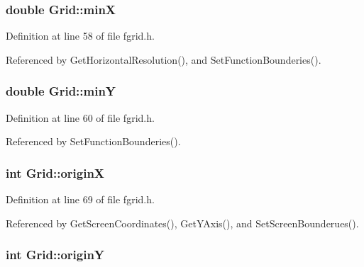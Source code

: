 \subsubsection[{\texorpdfstring{minX}{minX}}]{\setlength{\rightskip}{0pt plus 5cm}double Grid\+::minX\hspace{0.3cm}{\ttfamily [private]}}\hypertarget{classGrid_a70c775fad6a2cfa910a7e1f8c5b3e9b2}{}\label{classGrid_a70c775fad6a2cfa910a7e1f8c5b3e9b2}


Definition at line 58 of file fgrid.\+h.



Referenced by Get\+Horizontal\+Resolution(), and Set\+Function\+Bounderies().

\subsubsection[{\texorpdfstring{minY}{minY}}]{\setlength{\rightskip}{0pt plus 5cm}double Grid\+::minY\hspace{0.3cm}{\ttfamily [private]}}\hypertarget{classGrid_af592907852d983fe13ef9581ffd77e6b}{}\label{classGrid_af592907852d983fe13ef9581ffd77e6b}


Definition at line 60 of file fgrid.\+h.



Referenced by Set\+Function\+Bounderies().

\subsubsection[{\texorpdfstring{originX}{originX}}]{\setlength{\rightskip}{0pt plus 5cm}int Grid\+::originX\hspace{0.3cm}{\ttfamily [private]}}\hypertarget{classGrid_a0c0e10fa32d7fa78985cba0df1a34a0f}{}\label{classGrid_a0c0e10fa32d7fa78985cba0df1a34a0f}


Definition at line 69 of file fgrid.\+h.



Referenced by Get\+Screen\+Coordinates(), Get\+Y\+Axis(), and Set\+Screen\+Bounderues().

\subsubsection[{\texorpdfstring{originY}{originY}}]{\setlength{\rightskip}{0pt plus 5cm}int Grid\+::originY\hspace{0.3cm}{\ttfamily [private]}}\hypertarget{classGrid_add0854295a7e36ab9f77889862bfda0e}{}\label{classGrid_add0854295a7e36ab9f77889862bfda0e}


